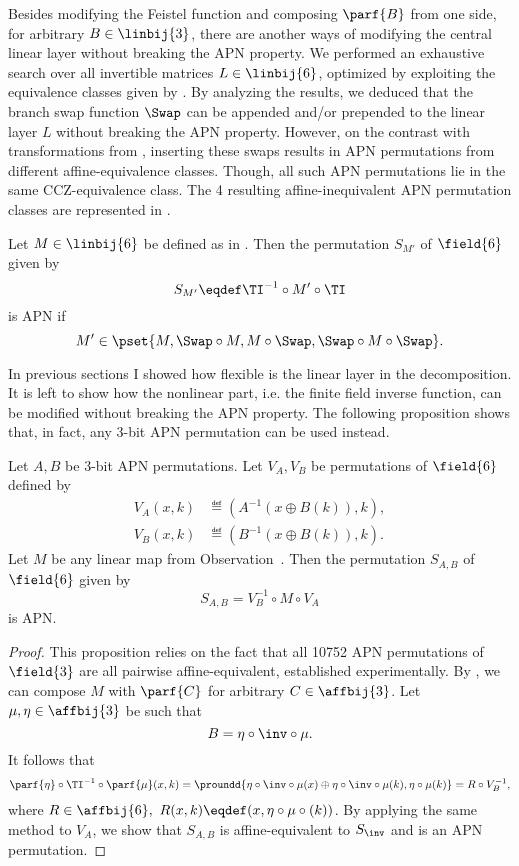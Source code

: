Besides modifying the Feistel function and composing $\parf{B}$ from one side, for arbitrary $B \in \linbij{3}$, there are another ways of modifying the central linear layer without breaking the APN property. We performed an exhaustive search over all invertible matrices $L \in \linbij{6}$, optimized by exploiting the equivalence classes given by . By analyzing the results, we deduced that the branch swap function $\Swap$ can be appended and/or prepended to the linear layer $L$ without breaking the APN property. However, on the contrast with transformations from , inserting these swaps results in APN permutations from different affine-equivalence classes. Though, all such APN permutations lie in the same CCZ-equivalence class. The 4 resulting affine-inequivalent APN permutation classes are represented in .

\begin{observation}
Let $M \in \linbij{6}$ be defined as in . Then the permutation $S_{M'}$ of $\field{6}$ given by
$$
S_{M'} \eqdef \TI^{-1} \circ M' \circ \TI
$$
is APN if 
$$
M' \in \pset{M, \Swap \circ M, M \circ \Swap, \Swap \circ M \circ \Swap}.
$$
\end{observation}





In previous sections I showed how flexible is the linear layer in the decomposition. It is left to show how the nonlinear part, i.e. the finite field inverse function, can be modified without breaking the APN property. The following proposition shows that, in fact, any 3-bit APN permutation can be used instead.

\begin{proposition}
Let $A,B$ be 3-bit APN permutations. Let $V_A, V_B$ be permutations of $\field{6}$ defined by
\begin{align*}
    V_A(x,k) &\eqdef (A^{-1}(x \oplus B(k)), k),\\
    V_B(x,k) &\eqdef (B^{-1}(x \oplus B(k)), k).
\end{align*}
Let $M$ be any linear map from Observation~. Then the permutation $S_{A,B}$ of $\field{6}$ given by
$$
S_{A,B} = V_B^{-1} \circ M \circ V_A
$$
is APN.
\end{proposition}
\begin{proof}
This proposition relies on the fact that all 10752 APN permutations of $\field{3}$ are all pairwise affine-equivalent, established experimentally. By , we can compose $M$ with $\parf{C}$ for arbitrary $C \in \affbij{3}$. Let $\mu, \eta \in \affbij{3}$ be such that $$
B = \eta \circ \inv \circ \mu.
$$
It follows that
$$
\parf{\eta} \circ \TI^{-1} \circ \parf{\mu}(x,k) = \proundd{
\eta\circ\inv\circ\mu(x) \oplus \eta\circ\inv\circ\mu(k), \eta\circ\mu(k)
} = R \circ V_B^{-1},
$$
where $R \in \affbij{6},~R(x,k)\eqdef(x,\eta\circ\mu\circ(k))$.
By applying the same method to $V_A$, we show that $S_{A,B}$ is affine-equivalent to $S_{\inv}$ and is an APN permutation. 
\end{proof}
